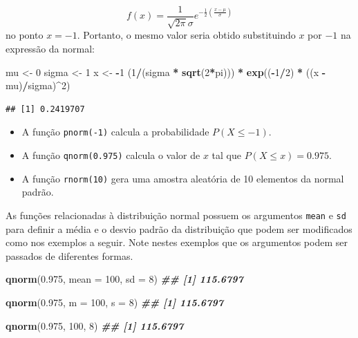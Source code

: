 \documentclass[
]{book}
\newenvironment{Shaded}{\begin{snugshade}}{\end{snugshade}}
\newcommand{\AttributeTok}[1]{\textcolor[rgb]{0.13,0.29,0.53}{#1}}
\newcommand{\DecValTok}[1]{\textcolor[rgb]{0.00,0.00,0.81}{#1}}
\newcommand{\DocumentationTok}[1]{\textcolor[rgb]{0.56,0.35,0.01}{\textbf{\textit{#1}}}}
\newcommand{\FloatTok}[1]{\textcolor[rgb]{0.00,0.00,0.81}{#1}}
\newcommand{\FunctionTok}[1]{\textcolor[rgb]{0.13,0.29,0.53}{\textbf{#1}}}
\newcommand{\NormalTok}[1]{#1}
\newcommand{\OtherTok}[1]{\textcolor[rgb]{0.56,0.35,0.01}{#1}}
\newcommand{\SpecialCharTok}[1]{\textcolor[rgb]{0.81,0.36,0.00}{\textbf{#1}}}
\begin{document}
\[f(x) = \frac{1}{\sqrt{2\pi}\sigma}e^{-\frac{1}{2}\left( \frac{x-\mu}{\sigma}\right)}\]
no ponto \(x=-1\). Portanto, o mesmo valor seria obtido substituindo \(x\) por \(-1\) na expressão da normal:

\begin{Shaded}
\begin{Highlighting}[]
\NormalTok{mu }\OtherTok{\textless{}{-}} \DecValTok{0}
\NormalTok{sigma }\OtherTok{\textless{}{-}} \DecValTok{1}
\NormalTok{x }\OtherTok{\textless{}{-}} \SpecialCharTok{{-}}\DecValTok{1}
\NormalTok{(}\DecValTok{1}\SpecialCharTok{/}\NormalTok{(sigma }\SpecialCharTok{*} \FunctionTok{sqrt}\NormalTok{(}\DecValTok{2}\SpecialCharTok{*}\NormalTok{pi))) }\SpecialCharTok{*} \FunctionTok{exp}\NormalTok{((}\SpecialCharTok{{-}}\DecValTok{1}\SpecialCharTok{/}\DecValTok{2}\NormalTok{) }\SpecialCharTok{*}\NormalTok{ ((x }\SpecialCharTok{{-}}\NormalTok{ mu)}\SpecialCharTok{/}\NormalTok{sigma)}\SpecialCharTok{\^{}}\DecValTok{2}\NormalTok{)}
\end{Highlighting}
\end{Shaded}

\begin{verbatim}
## [1] 0.2419707
\end{verbatim}

\begin{itemize}
\item
  A função \texttt{pnorm(-1)} calcula a probabilidade \(P(X \leq -1)\).
\item
  A função \texttt{qnorm(0.975)} calcula o valor de \(x\) tal que \(P(X\leq x) = 0.975\).
\item
  A função \texttt{rnorm(10)} gera uma amostra aleatória de 10 elementos da normal padrão.
\end{itemize}

As funções relacionadas à distribuição normal possuem os argumentos \texttt{mean} e \texttt{sd} para definir a média e o desvio padrão da distribuição que podem ser modificados como nos exemplos a seguir. Note nestes exemplos que os argumentos podem ser passados de diferentes formas.

\begin{Shaded}
\begin{Highlighting}[]
\FunctionTok{qnorm}\NormalTok{(}\FloatTok{0.975}\NormalTok{, }\AttributeTok{mean =} \DecValTok{100}\NormalTok{, }\AttributeTok{sd =} \DecValTok{8}\NormalTok{)}
\DocumentationTok{\#\# [1] 115.6797}

\FunctionTok{qnorm}\NormalTok{(}\FloatTok{0.975}\NormalTok{, }\AttributeTok{m =} \DecValTok{100}\NormalTok{, }\AttributeTok{s =} \DecValTok{8}\NormalTok{)}
\DocumentationTok{\#\# [1] 115.6797}

\FunctionTok{qnorm}\NormalTok{(}\FloatTok{0.975}\NormalTok{, }\DecValTok{100}\NormalTok{, }\DecValTok{8}\NormalTok{)}
\DocumentationTok{\#\# [1] 115.6797}
\end{Highlighting}
\end{Shaded}
\end{document}
